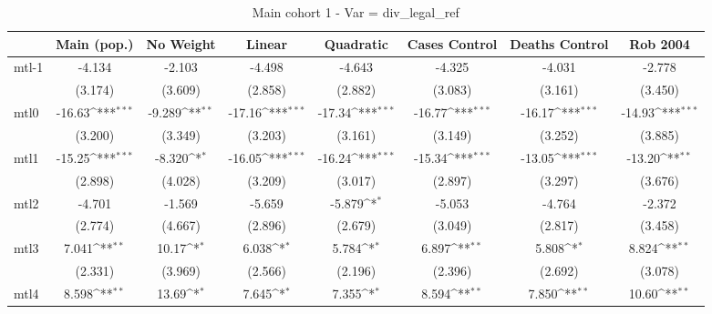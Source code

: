 \documentclass{article}
\begin{document}
{
\def\sym#1{\ifmmode^{#1}\else\(^{#1}\)\fi}
\begin{longtable}{l*{7}{c}}
\caption{Main cohort 1 - Var = div\_legal\_ref}\\
\hline\hline\endfirsthead\hline\endhead\hline\endfoot\endlastfoot
                &\multicolumn{1}{c}{Main (pop.)}&\multicolumn{1}{c}{No Weight}&\multicolumn{1}{c}{Linear}&\multicolumn{1}{c}{Quadratic}&\multicolumn{1}{c}{Cases Control}&\multicolumn{1}{c}{Deaths Control}&\multicolumn{1}{c}{Rob 2004}\\
\hline
mtl-1           &   -4.134         &   -2.103         &   -4.498         &   -4.643         &   -4.325         &   -4.031         &   -2.778         \\
                &  (3.174)         &  (3.609)         &  (2.858)         &  (2.882)         &  (3.083)         &  (3.161)         &  (3.450)         \\
mtl0            &   -16.63\sym{***}&   -9.289\sym{**} &   -17.16\sym{***}&   -17.34\sym{***}&   -16.77\sym{***}&   -16.17\sym{***}&   -14.93\sym{***}\\
                &  (3.200)         &  (3.349)         &  (3.203)         &  (3.161)         &  (3.149)         &  (3.252)         &  (3.885)         \\
mtl1            &   -15.25\sym{***}&   -8.320\sym{*}  &   -16.05\sym{***}&   -16.24\sym{***}&   -15.34\sym{***}&   -13.05\sym{***}&   -13.20\sym{**} \\
                &  (2.898)         &  (4.028)         &  (3.209)         &  (3.017)         &  (2.897)         &  (3.297)         &  (3.676)         \\
mtl2            &   -4.701         &   -1.569         &   -5.659         &   -5.879\sym{*}  &   -5.053         &   -4.764         &   -2.372         \\
                &  (2.774)         &  (4.667)         &  (2.896)         &  (2.679)         &  (3.049)         &  (2.817)         &  (3.458)         \\
mtl3            &    7.041\sym{**} &    10.17\sym{*}  &    6.038\sym{*}  &    5.784\sym{*}  &    6.897\sym{**} &    5.808\sym{*}  &    8.824\sym{**} \\
                &  (2.331)         &  (3.969)         &  (2.566)         &  (2.196)         &  (2.396)         &  (2.692)         &  (3.078)         \\
mtl4            &    8.598\sym{**} &    13.69\sym{*}  &    7.645\sym{*}  &    7.355\sym{*}  &    8.594\sym{**} &    7.850\sym{**} &    10.60\sym{**} \\

\end{longtable}}
\end{document}
